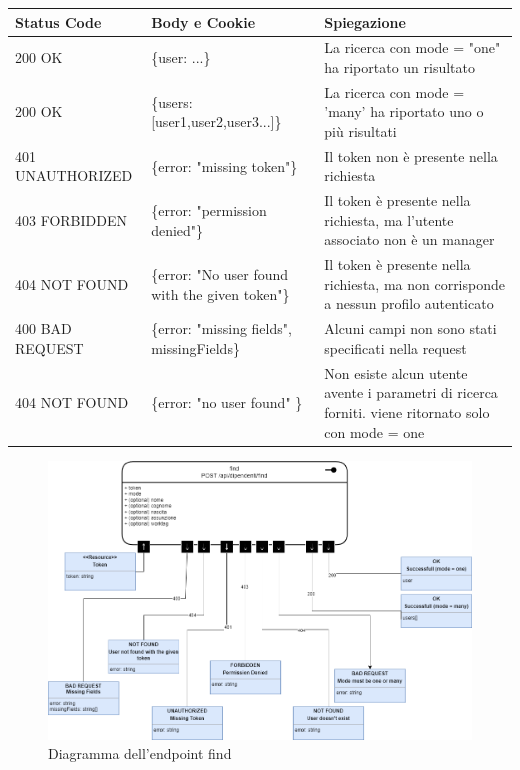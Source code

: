 \documentclass{report}
\begin{document}
\begin{center} %
	\centering
	\begin{tabular}{ |p{4cm}|p{5cm}|p{4cm}| }
		\hline
		\centering Status Code & \qquad\quad Body e Cookie                       & \qquad\qquad Spiegazione                                                                           \\ %
		\hline
		200 OK                 & \{user: {...}\}                                 & La ricerca con mode = "one" ha riportato un risultato                                              \\
		\hline
		200 OK                 & \{users: [user1,user2,user3...]\}               & La ricerca con mode = 'many' ha riportato uno o più risultati                                      \\
		\hline
		401 UNAUTHORIZED       & \{error: "missing token"\}                      & Il token non è presente nella richiesta                                                            \\
		\hline
		403 FORBIDDEN          & \{error: "permission denied"\}                  & Il token è presente nella richiesta, ma l'utente associato non è un manager                        \\
		\hline
		404 NOT FOUND          & \{error: "No user found with the given token"\} & Il token è presente nella richiesta, ma non corrisponde a nessun profilo autenticato               \\
		\hline
		400 BAD REQUEST        & \{error: "missing fields", missingFields\}      & Alcuni campi non sono stati specificati nella request                                              \\ %
		\hline
		404 NOT FOUND          & \{error: "no user found" \}                     & Non esiste alcun utente avente i parametri di ricerca forniti. viene ritornato solo con mode = one \\
		\hline
	\end{tabular}
\end{center}
\begin{figure}[H]
	\centering\includegraphics[width=1\textwidth]{images/microservizio-dipendenti/diagrams/find_diagram.drawio.png}
	\caption{Diagramma dell'endpoint find}
\end{figure}
\end{document}
